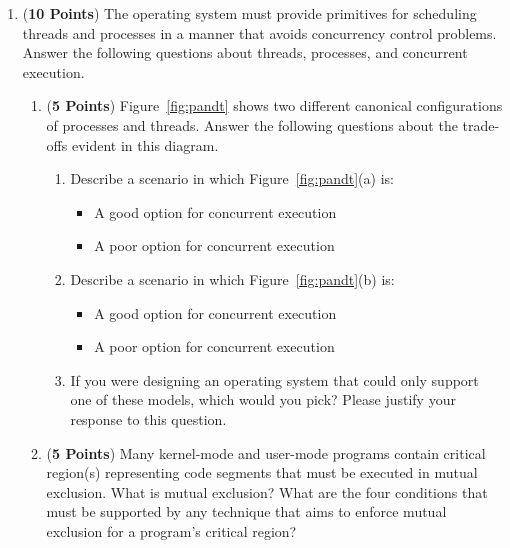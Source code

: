 \documentclass[12pt,epsf,psfig,graphics]{article}
\begin{document}
\begin{enumerate}
\item ({\bf 10 Points}) The operating system must provide primitives for scheduling threads and processes in a manner
  that avoids concurrency control problems. Answer the following questions about threads, processes, and concurrent
  execution.

\begin{enumerate}

  \item ({\bf 5 Points}) Figure~\ref{fig:pandt} shows two different canonical configurations of processes and threads. Answer the
    following questions about the trade-offs evident in this diagram.

    \begin{enumerate}

      \item Describe a scenario in which Figure~\ref{fig:pandt}(a) is:

        \begin{itemize}

          \item A good option for concurrent execution
          \item A poor option for concurrent execution

        \end{itemize}

      \item Describe a scenario in which Figure~\ref{fig:pandt}(b) is:

        \begin{itemize}

          \item A good option for concurrent execution
          \item A poor option for concurrent execution

        \end{itemize}

      \item If you were designing an operating system that could only support one of these models, which would you pick?
        Please justify your response to this question.

    \end{enumerate}

  \item ({\bf 5 Points}) Many kernel-mode and user-mode programs contain critical region(s) representing code
    segments that must be executed in mutual exclusion.  What is mutual exclusion? What are the four conditions that
    must be supported by any technique that aims to enforce mutual exclusion for a program's critical region?

\end{enumerate}

\end{enumerate}
\end{document}
